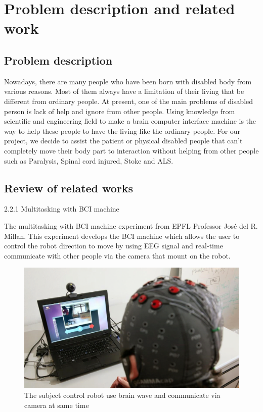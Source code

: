 \chapter{Problem description and related work}

\label{ch:Problem description and related work}

\setlength{\parindent}{4em}
\setlength{\parskip}{1em}
\renewcommand{\baselinestretch}{1.5}

\section{Problem description}
\hspace{1.5cm} Nowadays, there are many people who have been born with disabled body from various reasons. Most of them always have a limitation of their living that be different from ordinary people. At present, one of the main problems of disabled person is lack of help and ignore from other people. Using knowledge from scientific and engineering field to make a brain computer interface machine is the way to help these people to have the living like the ordinary people. For our project, we decide to assist the patient or physical disabled people that can't completely move their body part to interaction without helping from other people such as Paralysis, Spinal cord injured, Stoke and ALS.

\section{Review of related works}
\hspace{1.5cm} 2.2.1 Multitasking with BCI machine\cite{tow}

The multitasking with BCI machine experiment from EPFL Professor José del R. Millan. This experiment develops the BCI machine which allows the user to control the robot direction to move by using EEG signal and real-time communicate with other people via the camera that mount on the robot.
\begin{figure}[h]
	\centering
  	\includegraphics[scale = 0.4]{chapter2/21.pdf}
  	\caption{The subject control robot use brain wave and communicate via camera at same time}
\end{figure}

